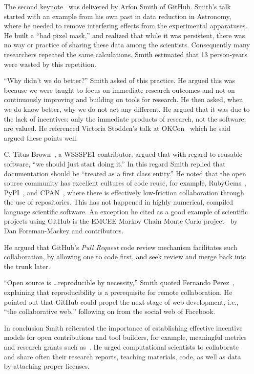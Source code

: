 \documentclass[11pt, oneside]{amsart}
\begin{document}
The second keynote~\cite{WSSSPE1-keynote2} was delivered by Arfon Smith of
GitHub. Smith's talk started with an example from his own past in data
reduction in Astronomy, where he needed to remove interfering effects from the
experimental apparatuses. He built a ``bad pixel mask,'' and realized that
while it was persistent, there was no way or practice of sharing these data
among the scientists. Consequently many researchers repeated the same
calculations. Smith estimated that 13 person-years were wasted by this
repetition.

``Why didn't we do better?''  Smith asked of this practice. He argued
this was because we were taught to focus on immediate research
outcomes and not on continuously improving and building on tools for
research. He then asked, when we do know better, why we do not act any
different. He argued that it was due to the lack of incentives:
only the immediate products of research, not the software, are valued.
He referenced Victoria Stodden's talk at
OKCon~\cite{okcon-stodden-talk} which he said argued these points
well.

C. Titus Brown~\cite{ged-web}, a WSSSPE1 contributor,
argued that with regard to reusable software, ``we should just start
doing it.'' In this regard Smith replied that documentation should be
``treated as a first class entity.''  He noted that the open source
community has excellent cultures of code reuse, for example,
RubyGems~\cite{rubygems-web}, PyPI~\cite{pypi-web}, and
CPAN~\cite{cpan-web}, where there is effectively low-friction
collaboration through the use of repositories. This has not happened
in highly numerical, compiled language scientific software.  An
exception he cited as a good example of scientific projects using
GitHub is the EMCEE Markov Chain Monte Carlo project~\cite{emcee-web}
by Dan Foreman-Mackey and contributors.

He argued that GitHub's \emph{Pull Request} code review mechanism
facilitates such collaboration, by allowing one to code first, and
seek review and merge back into the trunk later.

``Open source is \ldots reproducible by necessity,'' Smith quoted
Fernando Perez~\cite{perez-open-src-reproducible}, explaining that
reproducibility is a prerequisite for remote collaboration.  He
pointed out that GitHub could propel the next stage of web
development, i.e., ``the collaborative web,'' following on from the
social web of Facebook.

In conclusion Smith reiterated the importance of establishing effective
incentive models for open contributions and tool builders, for
example, meaningful metrics and research grants such as~\cite{NSF_software_vision}. He urged computational scientists to
collaborate and share often their research reports, teaching
materials, code, as well as data by attaching proper licenses.
\end{document}
